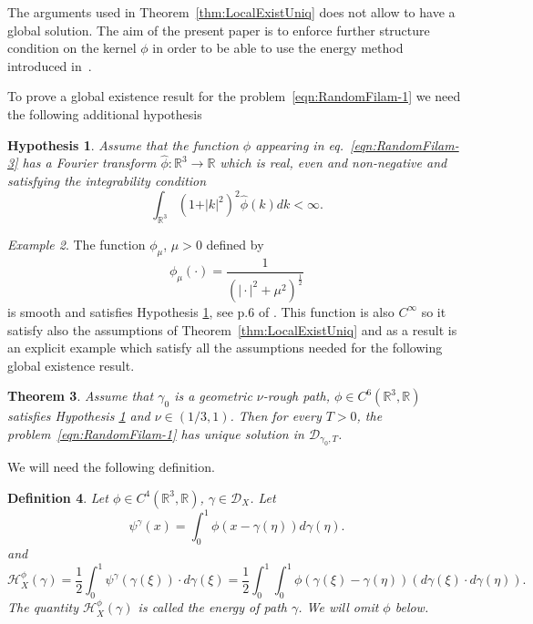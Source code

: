 \documentclass[11pt,a4paper,reqno]{amsart}%
\newcommand\half{\frac12}
\theoremstyle{plain}
\newtheorem{theorem}{Theorem}[section]
\theoremstyle{remark}
\newtheorem{example}[theorem]{Example}
\theoremstyle{plain}
\newtheorem{definition}[theorem]{Definition}
\newtheorem{hypothesis}[theorem]{Hypothesis}
\numberwithin{equation}{section}
\def\Rnu{{\mathbb R}}
\begin{document}
The arguments used in Theorem~\ref{thm:LocalExistUniq} does not allow to have a global solution. The aim of the present paper is to enforce further structure condition on the kernel $\phi$ in order to be able to use the energy method introduced in~\cite{[Bers+Gub_2007]}. 


To prove a global existence result for the problem~\eqref{eqn:RandomFilam-1} we need the following additional hypothesis
\begin{hypothesis}\label{hyp:PhiAssumptions}
 Assume that the function $\phi$ appearing in eq.~\eqref{eqn:RandomFilam-3} has a Fourier transform $\hat\phi:\Rnu^3\to\Rnu$ which is real, even and
non-negative and satisfying the integrability condition
$$
\int_{\Rnu^3}(1+\vert k\vert^2)^2\hat{\phi}(k)dk<\infty.
$$
\end{hypothesis}
\begin{example}
The function $\phi_\mu$, $\mu>0$ defined by
$$\phi_\mu(\cdot)=\frac{1}{(\vert \cdot\vert^2+\mu^2)^{\half}}$$
is smooth and satisfies Hypothesis \ref{hyp:PhiAssumptions}, see p.6
of \cite{[Bers+Gub_2007]}. This function is also $C^\infty$ so it satisfy also the assumptions of Theorem~\ref{thm:LocalExistUniq} and as a result is an explicit example which satisfy all the assumptions needed for the following global existence result. 
\end{example}
\begin{theorem}\label{thm:GlobalExistUniq}
Assume that  $\gamma_0$ is a geometric $\nu$-rough path, $\phi\in
C^6(\Rnu^3,\Rnu)$ satisfies   Hypothesis
\ref{hyp:PhiAssumptions} and  $\nu\in({1}/{3},1)$. Then for every $T>0$, the problem~\eqref{eqn:RandomFilam-1} has unique
solution in $\mathcal{D}_{\gamma_0,T}$.
\end{theorem}
We will need the following definition.
\begin{definition}
Let $\phi\in C^4(\Rnu^3,\Rnu)$, $\gamma\in \mathcal{D}_X$. Let
\begin{equation*}
\psi^{\gamma}(x)=\int_0^1\phi(x-\gamma(\eta))d\gamma(\eta).\label{eqn:EnergyIntegralDef-1a}
\end{equation*}
and
\begin{equation}
\mathcal{H}_X^{\phi}(\gamma)=\frac{1}{2}\int_0^1\psi^{\gamma}(\gamma(\xi))\cdot
d\gamma(\xi) = \frac{1}{2}\int_0^1 \int_0^1 \phi(\gamma(\xi)-\gamma(\eta))
(d\gamma(\xi)\cdot d\gamma(\eta)).
\label{eqn:EnergyIntegralDef-1}
\end{equation}
The quantity
$\mathcal{H}_X^{\phi}(\gamma)$ is called the energy of path $\gamma$. We will omit $\phi$ below.
\end{definition}
\end{document}
